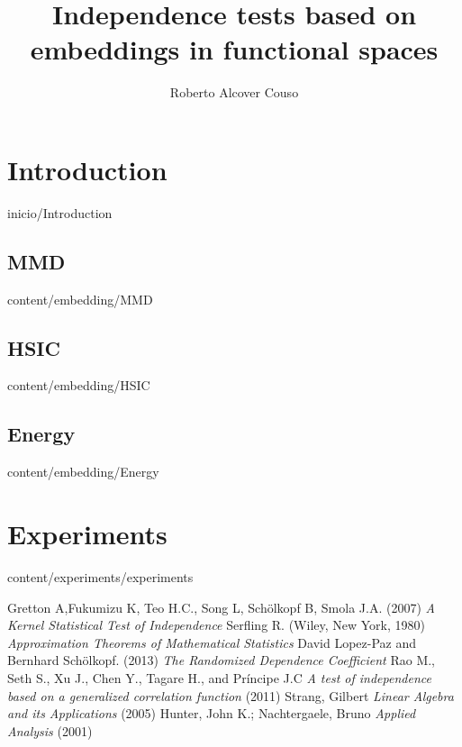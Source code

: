 \documentclass[epsbased,copyright,final,english,printable,covers,extendedindex,firstnumbered,tfg,gnuplot]{tfgtfmthesisuam}
\title[Independence tests]{Independence tests based on embeddings in functional spaces}
\author{Roberto Alcover Couso}
\begin{document}
\chapter{Introduction\label{CAP:INTRODUCCION}}{inicio/Introduction}
	\section{MMD\label{SEC:MMD}}{content/embedding/MMD}
	\section{HSIC\label{SEC:HSIC}}{content/embedding/HSIC}
	\section{Energy\label{SEC:Energy}}{content/embedding/Energy}
\chapter{Experiments\label{Cap:Experiments}}{content/experiments/experiments}
\begin{thebibliography}{9}
 Gretton A,Fukumizu K, Teo H.C., Song L, Schölkopf B, Smola J.A.
(2007)
\textit{A Kernel Statistical Test of Independence}
 Serfling R.
(Wiley, New York, 1980)
\textit{Approximation Theorems of Mathematical Statistics}
 David Lopez-Paz and Bernhard Schölkopf.
(2013)
\textit{The Randomized Dependence Coefficient}
 Rao M., Seth S., Xu J., Chen Y., Tagare H., and Príncipe J.C
\textit{A test of independence based on a generalized correlation function}
(2011)
 Strang, Gilbert 
\textit{Linear Algebra and its Applications}
(2005)
 Hunter, John K.; Nachtergaele, Bruno 
\textit{ Applied Analysis}
(2001)
\end{thebibliography}
\end{document}
